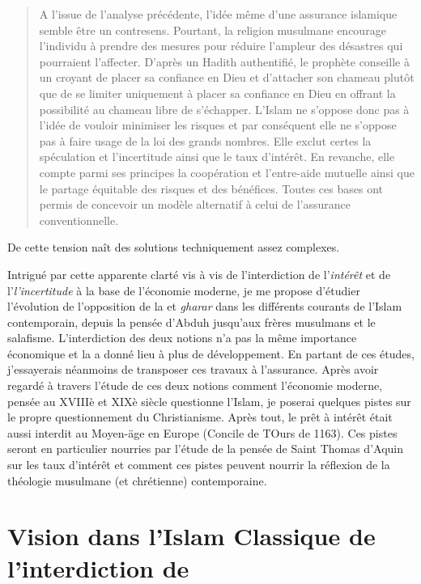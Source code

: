 \begin{quote}
     
A l'issue de l'analyse précédente, l'idée même d'une assurance islamique semble être un contresens. Pourtant, la religion musulmane encourage l'individu à prendre des mesures pour réduire l'ampleur des désastres qui pourraient l'affecter. D'après un Hadith authentifié, le prophète conseille à un croyant de placer sa confiance en Dieu et d'attacher son chameau plutôt que de se limiter uniquement à placer sa confiance en Dieu en offrant la possibilité au chameau libre de s'échapper. L'Islam ne s'oppose donc pas à l'idée de vouloir minimiser les risques et par conséquent elle ne s'oppose pas à faire usage de la loi des grands nombres. Elle exclut certes la spéculation et l'incertitude ainsi que le taux d'intérêt. En revanche, elle compte parmi ses principes la coopération et l'entre-aide mutuelle ainsi que le partage équitable des risques et des bénéfices. Toutes ces bases ont permis de concevoir un modèle alternatif à celui de l'assurance conventionnelle.
\end{quote}
De cette tension naît des solutions techniquement assez complexes.


Intrigué par cette apparente clarté vis à vis de l'interdiction de l'\textit{intérêt} et de l'\textit{l'incertitude} à la base de l'économie moderne, je me propose d'étudier l'évolution de l'opposition de la \emph{\riba} et \emph{gharar} dans les différents courants de l'Islam contemporain, depuis la pensée d'Abduh jusqu'aux frères musulmans et le salafisme. 
L'interdiction des deux notions n'a pas la même importance économique et la \textit{\riba} a donné lieu à plus de développement. En partant de ces études, j'essayerais néanmoins de transposer ces travaux à l'assurance.
Après avoir regardé  à travers l'étude de ces deux notions comment l'économie moderne, pensée au XVIIIè et XIXè siècle questionne l'Islam, je poserai quelques pistes sur le propre questionnement du Christianisme. Après tout, le prêt à intérêt était aussi interdit au Moyen-äge en Europe (Concile de TOurs de 1163). Ces pistes seront en particulier nourries par l'étude de la pensée de Saint Thomas d'Aquin sur les taux d'intérêt et comment ces pistes peuvent nourrir la réflexion de la théologie musulmane (et chrétienne) contemporaine. 
 

\section{Vision dans l'Islam Classique de l'interdiction de \riba}

